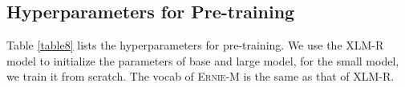 \documentclass[11pt]{article}
\begin{document}
\begin{table}[!h]
\centering

\vskip 0.1in

\caption{Statistics of parallel data used for \textsc{Ernie-M} pre-training.}
\label{table7}
\end{table}
\vskip -0.2in

\subsection{Hyperparameters for Pre-training}
Table \ref{table8} lists the hyperparameters for pre-training. We use the XLM-R model to initialize the parameters of base and large model, for the small model, we train it from scratch. The vocab of \textsc{Ernie-M} is the same as that of XLM-R.
\end{document}
